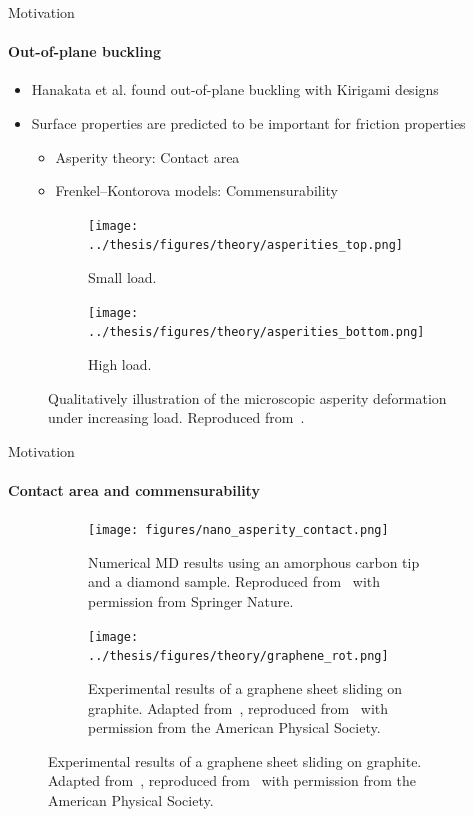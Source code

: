 \documentclass[
	10pt, %
]{beamer}
\begin{document}
\begin{frame}{Motivation}
	\framesubtitle{Out-of-plane buckling}
	\vspace{0.5cm}
	
	\begin{itemize}
		\item Hanakata et al. \cite{Hanakata_2018,Hanakata_2020} found out-of-plane buckling with Kirigami designs
		\item Surface properties are predicted to be important for friction properties
		\begin{itemize}
			\item Asperity theory: Contact area
			\item Frenkel–Kontorova models: Commensurability
		\end{itemize}
	\end{itemize}

	\begin{figure}[H]
		\centering
		\begin{subfigure}[b]{0.49\textwidth}
			\centering
			\texttt{[image: ../thesis/figures/theory/asperities\_top.png]}
			\caption{Small load.}
			\label{fig:asp_left}
		\end{subfigure}
		\hfill
		\begin{subfigure}[b]{0.49\textwidth}
			\centering
			\texttt{[image: ../thesis/figures/theory/asperities\_bottom.png]}
			\caption{High load.}
			\label{fig:asp_right}
		\end{subfigure}
		\caption{Qualitatively illustration of the microscopic asperity deformation under increasing load. Reproduced from~\cite{wiki:asperities}.}
	\end{figure}
\end{frame}
%
%
\begin{frame}{Motivation}
\framesubtitle{Contact area and commensurability}
\begin{figure}[H]
	\centering
	\begin{subfigure}[b]{0.46\textwidth}
		\centering
		\texttt{[image: figures/nano\_asperity\_contact.png]}
		\caption{Numerical MD results using an amorphous carbon tip and a diamond sample. Reproduced from~\cite{mo_friction_2009} with permission from Springer Nature.}
	\end{subfigure}
	\hfill
	\begin{subfigure}[b]{0.49\textwidth}
		\centering
		\texttt{[image: ../thesis/figures/theory/graphene\_rot.png]}
		\caption{Experimental results of a graphene sheet sliding on graphite. Adapted from~\cite{DIENWIEBEL2005197}, reproduced from~\cite{Vanossi_2013} with permission from the American Physical Society.}
	\end{subfigure}
\end{figure}
\end{frame}
%
%
\end{document}
